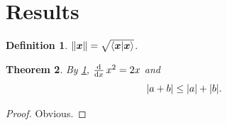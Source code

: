 \documentclass{article}
\newtheorem{theorem}{Theorem}[section]
\theoremstyle{definition}
\newtheorem{defn}[theorem]{Definition}
\begin{document}
\section{Results}
\begin{defn}\label{def:norm} $\norm{\bm{x}} = \sqrt{\ip{\bm x}{\bm x}}$. \end{defn}
\begin{theorem}\label{thm:main} By \cref{def:norm}, $\dv{x}\, x^2 = 2x$ and
\begin{equation*} \abs{a+b} \le \abs{a} + \abs{b}. \end{equation*}
\end{theorem}
\begin{proof} Obvious. \end{proof}
\end{document}
